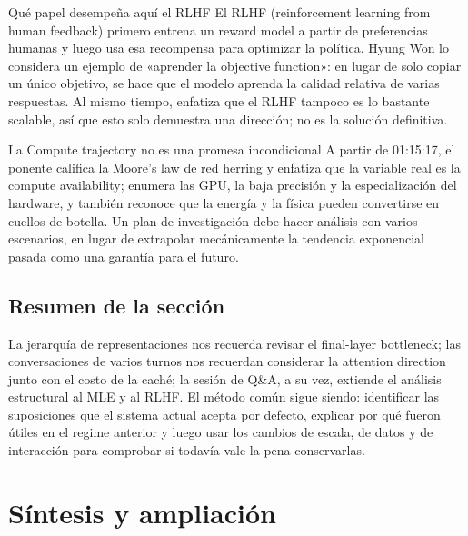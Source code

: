 \documentclass[a4paper]{article}
\begin{document}
\begin{knowledgebox}{Qué papel desempeña aquí el RLHF}
El RLHF (reinforcement learning from human feedback) primero entrena un reward model a partir de preferencias humanas y luego usa esa recompensa para optimizar la política. Hyung Won lo considera un ejemplo de «aprender la objective function»: en lugar de solo copiar un único objetivo, se hace que el modelo aprenda la calidad relativa de varias respuestas. Al mismo tiempo, enfatiza que el RLHF tampoco es lo bastante scalable, así que esto solo demuestra una dirección; no es la solución definitiva.
\end{knowledgebox}


\begin{warningbox}{La Compute trajectory no es una promesa incondicional}
A partir de 01:15:17, el ponente califica la Moore's law de red herring y enfatiza que la variable real es la compute availability; enumera las GPU, la baja precisión y la especialización del hardware, y también reconoce que la energía y la física pueden convertirse en cuellos de botella. Un plan de investigación debe hacer análisis con varios escenarios, en lugar de extrapolar mecánicamente la tendencia exponencial pasada como una garantía para el futuro.
\end{warningbox}

\subsection{Resumen de la sección}

La jerarquía de representaciones nos recuerda revisar el final-layer bottleneck; las conversaciones de varios turnos nos recuerdan considerar la attention direction junto con el costo de la caché; la sesión de Q\&A, a su vez, extiende el análisis estructural al MLE y al RLHF. El método común sigue siendo: identificar las suposiciones que el sistema actual acepta por defecto, explicar por qué fueron útiles en el regime anterior y luego usar los cambios de escala, de datos y de interacción para comprobar si todavía vale la pena conservarlas.
\section{Síntesis y ampliación}
\end{document}
